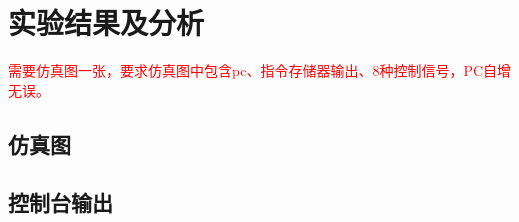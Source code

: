 \section{实验结果及分析}
\textcolor{red}{需要仿真图一张，要求仿真图中包含pc、指令存储器输出、8种控制信号，PC自增无误。}
\subsection{仿真图}

\subsection{控制台输出}